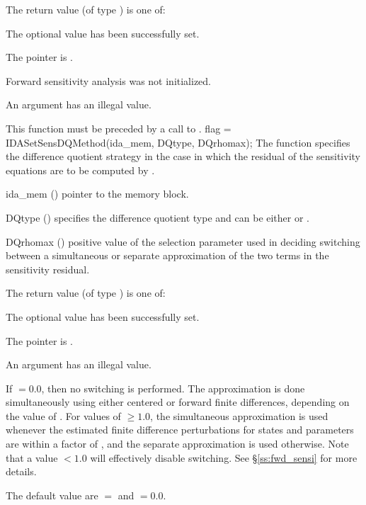 {
  The return value  (of type ) is one of:
  \begin{args}
  \item[\Id{IDA\_SUCCESS}] 
    The optional value has been successfully set.
  \item[\Id{IDA\_MEM\_NULL}]
    The  pointer is .
  \item[\Id{IDA\_NO\_SENS}]
    Forward sensitivity analysis was not initialized.
  \item[\Id{IDA\_ILL\_INPUT}]
    An argument has an illegal value.
  \end{args}
}
{
  {\warn}This function must be preceded by a call to .
}
{
  flag = IDASetSensDQMethod(ida\_mem, DQtype, DQrhomax);
}
{
  The function  specifies the difference quotient strategy in
  the case in which the residual of the sensitivity equations are to
  be computed by {\idas}.
}
{
  \begin{args}
  \item[ida\_mem] ()
    pointer to the {\idas} memory block.
  \item[DQtype] ()
    specifies the difference quotient type and can be either 
    or .
  \item[DQrhomax] ()
    positive value of the selection parameter used in deciding switching between a simultaneous
    or separate approximation of the two terms in the sensitivity residual.
  \end{args}
}
{
  The return value  (of type ) is one of:
  \begin{args}
  \item[\Id{IDA\_SUCCESS}]
    The optional value has been successfully set.
  \item[\Id{IDA\_MEM\_NULL}]
    The  pointer is .
  \item[\Id{IDA\_ILL\_INPUT}]
    An argument has an illegal value.
  \end{args}
}
{
  If  $= 0.0$, then no switching is performed. The approximation is done simultaneously
  using either centered or forward finite differences, depending on the value of . 
  For values of  $\ge 1.0$, the simultaneous approximation is used whenever the 
  estimated finite difference perturbations for states and parameters are within a factor of
  , and the separate approximation is used otherwise. Note that a value 
   $< 1.0$ will effectively disable switching.   
  See \S\ref{ss:fwd_sensi} for more details.

  The default value are $=$ and $=0.0$. 
}

